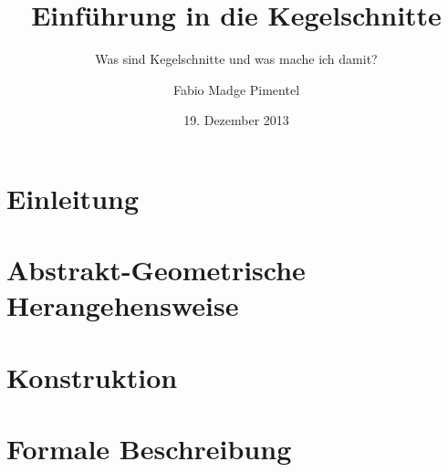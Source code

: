 \documentclass{beamer}
\title[Grundlagen der Kegelschnitte]{Einführung in die Kegelschnitte}
\subtitle{Was sind Kegelschnitte und was mache ich damit?}
\author[F. Madge Pimentel]{Fabio Madge Pimentel}
\institute{Josef-Hofmiller-Gymnasium,\\
  Freising}
\date[19.12.13]{19. Dezember 2013}
\begin{document}
\section{Einleitung}

\begin{frame}
\titlepage
\end{frame}



\section{Abstrakt-Geometrische Herangehensweise}


\section{Konstruktion}


\section{Formale Beschreibung}

\end{document}
